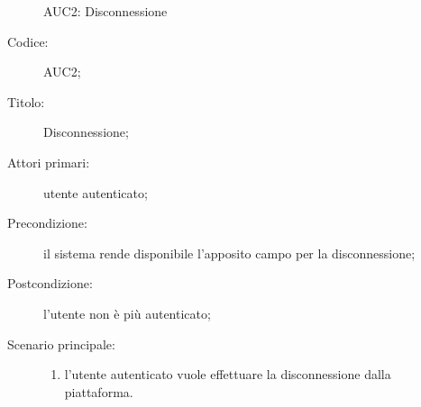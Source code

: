 \documentclass[../../../analisi-dei-requisiti.tex]{subfiles}
\begin{document}
\begin{figure}[H]
  \centering
  \caption{AUC2: Disconnessione}%
  \label{fig:AUC2}
\end{figure}

\begin{description}
  \item[Codice:] AUC2;
  \item[Titolo:] Disconnessione;
  \item[Attori primari:] utente autenticato;
  \item[Precondizione:] il sistema rende disponibile l'apposito campo per la disconnessione;
  \item[Postcondizione:] l'utente non è più autenticato;
  \item[Scenario principale:]
  \begin{enumerate}
    \item l'utente autenticato vuole effettuare la disconnessione dalla piattaforma.
  \end{enumerate}
\end{description}
\end{document}
